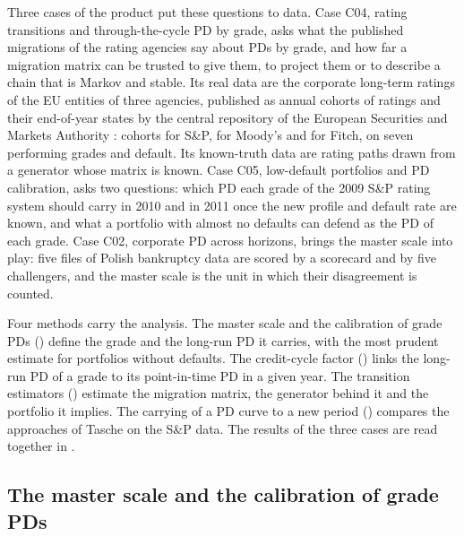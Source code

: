 Three cases of the product put these questions to data. Case C04, rating transitions and through-the-cycle PD by grade, asks what the published migrations of the rating agencies say about PDs by grade, and how far a migration matrix can be trusted to give them, to project them or to describe a chain that is Markov and stable. Its real data are the corporate long-term ratings of the EU entities of three agencies, published as annual cohorts of ratings and their end-of-year states by the central repository of the European Securities and Markets Authority \citep{ratings:cerep}: \rtgCohortsSp{} cohorts for S\&P, \rtgCohortsMoodys{} for Moody's and \rtgCohortsFitch{} for Fitch, on seven performing grades and default. Its known-truth data are rating paths drawn from a generator whose matrix is known. Case C05, low-default portfolios and PD calibration, asks two questions: which PD each grade of the 2009 S\&P rating system should carry in 2010 and in 2011 once the new profile and default rate are known, and what a portfolio with almost no defaults can defend as the PD of each grade. Case C02, corporate PD across horizons, brings the master scale into play: five files of Polish bankruptcy data are scored by a scorecard and by five challengers, and the master scale is the unit in which their disagreement is counted.

Four methods carry the analysis. The master scale and the calibration of grade PDs () define the grade and the long-run PD it carries, with the most prudent estimate for portfolios without defaults. The credit-cycle factor () links the long-run PD of a grade to its point-in-time PD in a given year. The transition estimators () estimate the migration matrix, the generator behind it and the portfolio it implies. The carrying of a PD curve to a new period () compares the approaches of Tasche on the S\&P data. The results of the three cases are read together in .

\subsection{The master scale and the calibration of grade PDs}
\label{sec:m7}

